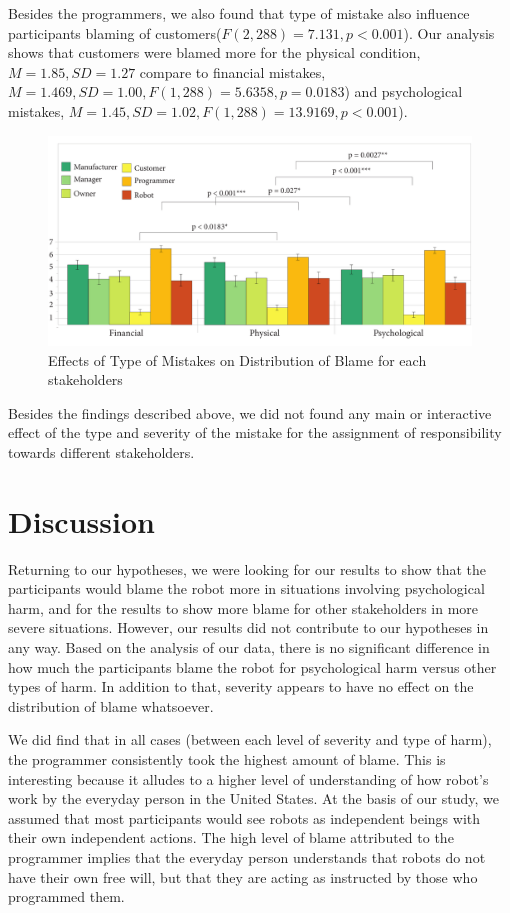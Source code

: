 \documentclass{sigchi}
\begin{document}
Besides the programmers, we also found that type of mistake also influence participants blaming of customers($F(2,288)=7.131, p < 0.001$). Our analysis shows that customers were blamed more for the physical condition,$M=1.85, SD=1.27$ compare to financial mistakes,$M=1.469, SD=1.00, F(1,288)=5.6358, p = 0.0183$) and psychological mistakes, $M=1.45, SD=1.02, F(1,288)=13.9169, p < 0.001$).

\begin{figure}[!h]
\centering
\includegraphics[width=1.0\columnwidth]{typeGraph}
\caption{Effects of Type of Mistakes on Distribution of Blame for each stakeholders}
\label{fig:figure5}
\end{figure}

Besides the findings described above, we did not found any main or interactive effect of the type and severity of the mistake for the assignment of responsibility towards different stakeholders.


\section{Discussion}
Returning to our hypotheses, we were looking for our results to show that the participants would blame the robot more in situations involving psychological harm, and for the results to show more blame for other stakeholders in more severe situations. However, our results did not contribute to our hypotheses in any way. Based on the analysis of our data, there is no significant difference in how much the participants blame the robot for psychological harm versus other types of harm. In addition to that, severity appears to have no effect on the distribution of blame whatsoever.

We did find that in all cases (between each level of severity and type of harm), the programmer consistently took the highest amount of blame. This is interesting because it alludes to a higher level of understanding of how robot's work by the everyday person in the United States. At the basis of our study, we assumed that most participants would see robots as independent beings with their own independent actions. The high level of blame attributed to the programmer implies that the everyday person understands that robots do not have their own free will, but that they are acting as instructed by those who programmed them.
\end{document}
